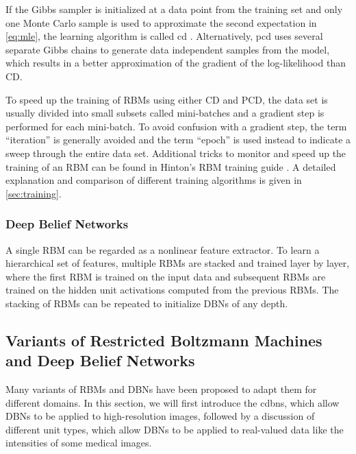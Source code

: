 If the Gibbs sampler is initialized at a data point from the training set and
only one Monte Carlo sample is used to approximate the second expectation in
\ref{eq:mle}, the learning algorithm is called \gls{cd} \citep{hinton2002}.
Alternatively, \gls{pcd} \citep{tieleman2008} uses several separate Gibbs chains
to generate data independent samples from the model, which results in a better
approximation of the gradient of the log-likelihood than CD.

To speed up the training of RBMs using either CD and PCD, the data set is
usually divided into small subsets called mini-batches and a gradient step is
performed for each mini-batch. To avoid confusion with a gradient step, the term
``iteration'' is generally avoided and the term ``epoch'' is used instead to
indicate a sweep through the entire data set. Additional tricks to monitor and
speed up the training of an RBM can be found in Hinton's RBM training guide
\citep{hinton2010a}. A detailed explanation and comparison of different training
algorithms is given in \ref{sec:training}.

\subsubsection[Deep belief networks]{Deep Belief Networks}

%

A single RBM can be regarded as a nonlinear feature extractor. To learn a
hierarchical set of features, multiple RBMs are stacked and trained layer by
layer, where the first RBM is trained on the input data and subsequent RBMs are
trained on the hidden unit activations computed from the previous RBMs. The
stacking of RBMs can be repeated to initialize DBNs of any depth.

\subsection[Variants of restricted Boltzmann machines and deep belief
networks]{Variants of Restricted Boltzmann Machines and Deep Belief
Networks}

Many variants of RBMs and DBNs have been proposed to adapt them for different
domains. In this section, we will first introduce the \glspl{cdbn}, which allow
DBNs to be applied to high-resolution images, followed by a discussion of
different unit types, which allow DBNs to be applied to real-valued data like
the intensities of some medical images.

